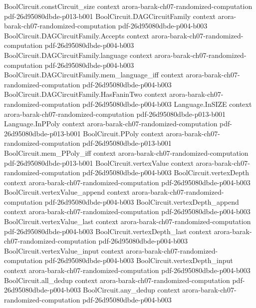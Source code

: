 \begin{theorem}
\proofstep
  {BoolCircuit.constCircuit_size}
  {context}
  {arora-barak-ch07-randomized-computation}
  {pdf-26d95080dbde-p013-b001}
\proofstep
  {BoolCircuit.DAGCircuitFamily}
  {context}
  {arora-barak-ch07-randomized-computation}
  {pdf-26d95080dbde-p004-b003}
\proofstep
  {BoolCircuit.DAGCircuitFamily.Accepts}
  {context}
  {arora-barak-ch07-randomized-computation}
  {pdf-26d95080dbde-p004-b003}
\proofstep
  {BoolCircuit.DAGCircuitFamily.language}
  {context}
  {arora-barak-ch07-randomized-computation}
  {pdf-26d95080dbde-p004-b003}
\proofstep
  {BoolCircuit.DAGCircuitFamily.mem_language_iff}
  {context}
  {arora-barak-ch07-randomized-computation}
  {pdf-26d95080dbde-p004-b003}
\proofstep
  {BoolCircuit.DAGCircuitFamily.HasFaninTwo}
  {context}
  {arora-barak-ch07-randomized-computation}
  {pdf-26d95080dbde-p004-b003}
\proofstep
  {Language.InSIZE}
  {context}
  {arora-barak-ch07-randomized-computation}
  {pdf-26d95080dbde-p013-b001}
\proofstep
  {Language.InPPoly}
  {context}
  {arora-barak-ch07-randomized-computation}
  {pdf-26d95080dbde-p013-b001}
\proofstep
  {BoolCircuit.PPoly}
  {context}
  {arora-barak-ch07-randomized-computation}
  {pdf-26d95080dbde-p013-b001}
\proofstep
  {BoolCircuit.mem_PPoly_iff}
  {context}
  {arora-barak-ch07-randomized-computation}
  {pdf-26d95080dbde-p013-b001}
\proofstep
  {BoolCircuit.vertexValue}
  {context}
  {arora-barak-ch07-randomized-computation}
  {pdf-26d95080dbde-p004-b003}
\proofstep
  {BoolCircuit.vertexDepth}
  {context}
  {arora-barak-ch07-randomized-computation}
  {pdf-26d95080dbde-p004-b003}
\proofstep
  {BoolCircuit.vertexValue_append}
  {context}
  {arora-barak-ch07-randomized-computation}
  {pdf-26d95080dbde-p004-b003}
\proofstep
  {BoolCircuit.vertexDepth_append}
  {context}
  {arora-barak-ch07-randomized-computation}
  {pdf-26d95080dbde-p004-b003}
\proofstep
  {BoolCircuit.vertexValue_last}
  {context}
  {arora-barak-ch07-randomized-computation}
  {pdf-26d95080dbde-p004-b003}
\proofstep
  {BoolCircuit.vertexDepth_last}
  {context}
  {arora-barak-ch07-randomized-computation}
  {pdf-26d95080dbde-p004-b003}
\proofstep
  {BoolCircuit.vertexValue_input}
  {context}
  {arora-barak-ch07-randomized-computation}
  {pdf-26d95080dbde-p004-b003}
\proofstep
  {BoolCircuit.vertexDepth_input}
  {context}
  {arora-barak-ch07-randomized-computation}
  {pdf-26d95080dbde-p004-b003}
\proofstep
  {BoolCircuit.all_dedup}
  {context}
  {arora-barak-ch07-randomized-computation}
  {pdf-26d95080dbde-p004-b003}
\proofstep
  {BoolCircuit.any_dedup}
  {context}
  {arora-barak-ch07-randomized-computation}
  {pdf-26d95080dbde-p004-b003}

\end{theorem}
